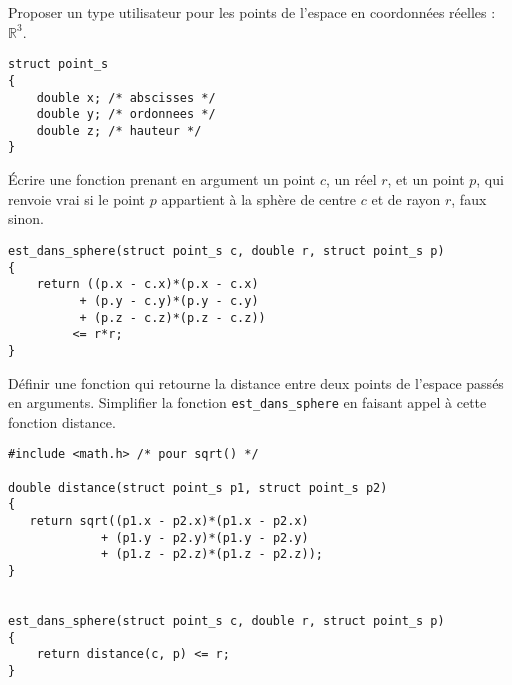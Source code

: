 
\begin{lastenu}
\item Proposer un type utilisateur pour les points de l'espace
  en coordonnées réelles : $\mathbb{R}^3$.
  \begin{correction}
\begin{verbatim}
struct point_s
{
    double x; /* abscisses */
    double y; /* ordonnees */
    double z; /* hauteur */
}
\end{verbatim}
\end{correction}

\item Écrire une fonction  prenant en argument un
  point $c$, un réel $r$, et un point $p$, qui
  renvoie vrai si le point $p$ appartient à la sphère de centre $c$ et
  de rayon $r$, faux sinon.
  \begin{correction}
\begin{verbatim}
est_dans_sphere(struct point_s c, double r, struct point_s p)
{
    return ((p.x - c.x)*(p.x - c.x)
          + (p.y - c.y)*(p.y - c.y)
          + (p.z - c.z)*(p.z - c.z))
         <= r*r;
}
\end{verbatim}

\end{correction}
\item Définir une fonction  qui retourne la distance entre
  deux points de l'espace passés en arguments. Simplifier la fonction
  \verb|est_dans_sphere| en faisant appel à cette fonction distance.
\begin{correction}
\begin{verbatim}
#include <math.h> /* pour sqrt() */

double distance(struct point_s p1, struct point_s p2)
{
   return sqrt((p1.x - p2.x)*(p1.x - p2.x)
             + (p1.y - p2.y)*(p1.y - p2.y)
             + (p1.z - p2.z)*(p1.z - p2.z));
}


est_dans_sphere(struct point_s c, double r, struct point_s p)
{
    return distance(c, p) <= r;
}
\end{verbatim}
\end{correction}


\end{lastenu}
